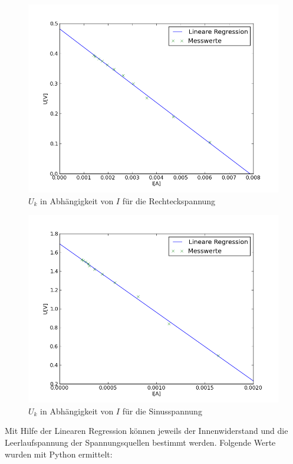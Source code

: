 \documentclass[11pt,ngerman,a4paper]{article}
\begin{document}
\begin{figure}
\centering
\includegraphics[scale=1.00]{Plot2.png}
\caption{$U_k$ in Abh\"angigkeit von $I$ f\"ur die Rechteckspannung}
\label{Plot2}
\end{figure}
\begin{figure}
\centering
\includegraphics[scale=1.00]{Plot3.png}
\caption{$U_k$ in Abh\"angigkeit von $I$ f\"ur die Sinusspannung}
\label{Plot3}
\end{figure}

\noindent
Mit Hilfe der Linearen Regression können jeweils der Innenwiderstand und die Leerlaufspannung der Spannungsquellen bestimmt werden. Folgende Werte wurden mit Python ermittelt:
\end{document}
